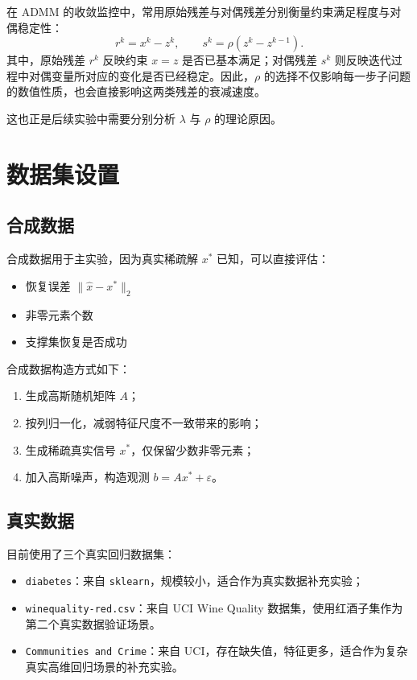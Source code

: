 \documentclass[12pt,a4paper]{ctexart}
\begin{document}
在 ADMM 的收敛监控中，常用原始残差与对偶残差分别衡量约束满足程度与对偶稳定性：
\[
r^k=x^k-z^k,\qquad s^k=\rho(z^k-z^{k-1}).
\]
其中，原始残差 $r^k$ 反映约束 $x=z$ 是否已基本满足；对偶残差 $s^k$ 则反映迭代过程中对偶变量所对应的变化是否已经稳定。因此，$\rho$ 的选择不仅影响每一步子问题的数值性质，也会直接影响这两类残差的衰减速度。

这也正是后续实验中需要分别分析 $\lambda$ 与 $\rho$ 的理论原因。

\section{数据集设置}
\subsection{合成数据}
合成数据用于主实验，因为真实稀疏解 $x^\ast$ 已知，可以直接评估：
\begin{itemize}[leftmargin=2em]
    \item 恢复误差 $\|\hat{x} - x^\ast\|_2$
    \item 非零元素个数
    \item 支撑集恢复是否成功
\end{itemize}

合成数据构造方式如下：
\begin{enumerate}[label=\arabic*.]
    \item 生成高斯随机矩阵 $A$；
    \item 按列归一化，减弱特征尺度不一致带来的影响；
    \item 生成稀疏真实信号 $x^\ast$，仅保留少数非零元素；
    \item 加入高斯噪声，构造观测 $b = Ax^\ast + \varepsilon$。
\end{enumerate}

\subsection{真实数据}
目前使用了三个真实回归数据集：
\begin{itemize}[leftmargin=2em]
    \item \texttt{diabetes}：来自 \texttt{sklearn}，规模较小，适合作为真实数据补充实验；
    \item \texttt{winequality-red.csv}：来自 UCI Wine Quality 数据集，使用红酒子集作为第二个真实数据验证场景。
    \item \texttt{Communities and Crime}：来自 UCI，存在缺失值，特征更多，适合作为复杂真实高维回归场景的补充实验。
\end{itemize}
\end{document}
